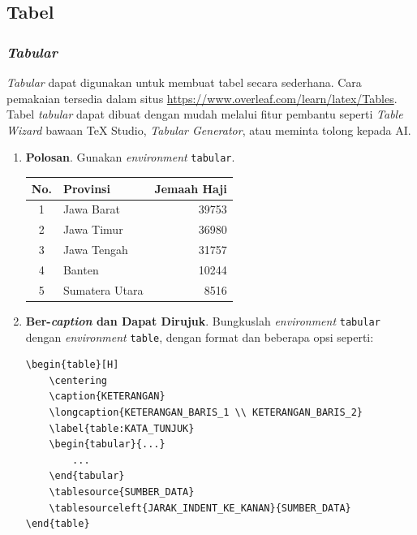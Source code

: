 \subsection{Tabel}

\subsubsection{\textit{Tabular}}

\textit{Tabular} dapat digunakan untuk membuat tabel secara sederhana. Cara pemakaian tersedia dalam situs \url{https://www.overleaf.com/learn/latex/Tables}. Tabel \textit{tabular} dapat dibuat dengan mudah melalui fitur pembantu seperti \textit{Table Wizard} bawaan TeX Studio, \textit{Tabular Generator}, atau meminta tolong kepada AI.

\begin{enumerate}[label=\alph*.]
    \item \textbf{Polosan}. Gunakan \textit{environment} \texttt{tabular}.
    \begin{center}
        \begin{tabular}{c l r}
            \hline
            No. & Provinsi & Jemaah Haji \\
            \hline
            1 & Jawa Barat & 39753 \\
            2 & Jawa Timur & 36980 \\
            3 & Jawa Tengah & 31757 \\
            4 & Banten & 10244 \\
            5 & Sumatera Utara & 8516 \\
            \hline
        \end{tabular}
    \end{center}
    
    \item \textbf{Ber-\textit{caption} dan Dapat Dirujuk}. Bungkuslah \textit{environment} \texttt{tabular} dengan \textit{environment} \texttt{table}, dengan format dan beberapa opsi seperti:
    \begin{lstlisting}[]
\begin{table}[H]
    \centering
    \caption{KETERANGAN}
    \longcaption{KETERANGAN_BARIS_1 \\ KETERANGAN_BARIS_2}
    \label{table:KATA_TUNJUK}
    \begin{tabular}{...}
        ...
    \end{tabular}
    \tablesource{SUMBER_DATA}
    \tablesourceleft{JARAK_INDENT_KE_KANAN}{SUMBER_DATA}
\end{table}
    \end{lstlisting}
    

\end{enumerate}
